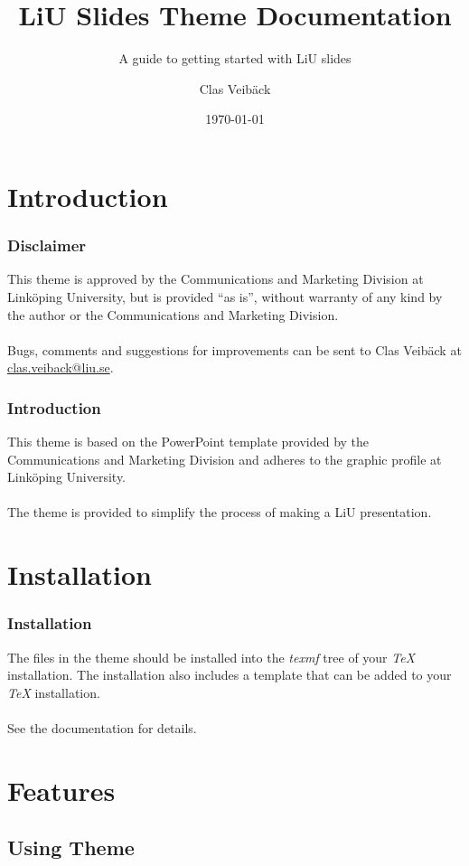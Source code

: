 \documentclass[noamsthm, english]{beamer}%
\title[LiU Slides Documentation]{LiU Slides Theme Documentation}%
\subtitle{A guide to getting started with LiU slides}%
\author{Clas Veibäck}%
\institute{Automatic Control\\%
Department of Electrical Engineering\\%
Linköping University}%
\date{\today}%
\begin{document}
%

\maketitle
\makeoutline

\section{Introduction}

\begin{frame}
\frametitle{Disclaimer}
This theme is approved by the Communications and Marketing Division at Linköping University, but is provided ``as is'', without warranty of any kind by the author or the Communications and Marketing Division.
\\~\\
Bugs, comments and suggestions for improvements can be sent to Clas Veibäck at \href{mailto:clas.veiback@liu.se}{clas.veiback@liu.se}. 
\end{frame}

\begin{frame}
\frametitle{Introduction}
This theme is based on the PowerPoint template provided by the Communications and Marketing Division and adheres to the graphic profile at Linköping University. 
\\~\\
The theme is provided to simplify the process of making a LiU presentation.
\end{frame}

\section{Installation}

\begin{frame}
\frametitle{Installation}
The files in the theme should be installed into the \emph{texmf} tree of your \emph{TeX} installation. The installation also includes a template that can be added to your \emph{TeX} installation.
\\~\\
See the documentation for details.
\end{frame}

\section{Features}
\subsection{Using Theme}
\end{document}
